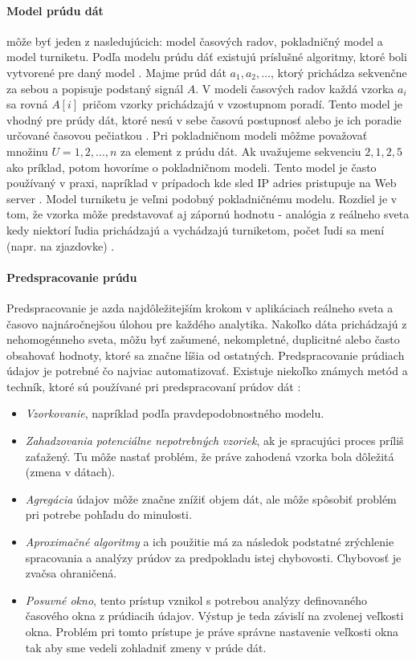 \paragraph{Model prúdu dát} môže byť jeden z nasledujúcich: model časových radov, pokladničný model a model turniketu. Podľa modelu prúdu dáť existujú príslušné algoritmy, ktoré boli vytvorené pre daný model \citep{tran2014change}. Majme prúd dát $a_1, a_2, ...$, ktorý prichádza sekvenčne za sebou a popisuje podstaný signál $A$. 
V modeli časových radov každá vzorka $a_i$ sa rovná $A[i]$ pričom vzorky prichádzajú v vzostupnom poradí. Tento model je vhodný pre prúdy dát, ktoré nesú v sebe časovú postupnosť alebo je ich poradie určované časovou pečiatkou \citep{muthukrishnan2005data}.
Pri pokladničnom modeli môžme považovať množinu $U = {1, 2, ..., n}$ za element z prúdu dát. Ak uvažujeme sekvenciu $2, 1, 2, 5$ ako príklad, potom hovoríme o pokladničnom modeli. Tento model je často používaný v praxi, napríklad v prípadoch kde sled IP adries pristupuje na Web server \citep{ikonomovska2013algorithmic, muthukrishnan2005data}.
Model turniketu je veľmi podobný pokladničnému modelu. Rozdiel je v tom, že vzorka môže predstavovať aj zápornú hodnotu - analógia z reálneho sveta kedy niektorí ľudia prichádzajú a vychádzajú turniketom, počet ľudi sa mení (napr. na zjazdovke) \citep{ikonomovska2013algorithmic, muthukrishnan2005data}.

\paragraph{Predspracovanie prúdu}
Predspracovanie je azda najdôležitejším krokom v aplikáciach reálneho sveta a časovo najnáročnejšou úlohou pre každého analytika. Nakoľko dáta prichádzajú z nehomogénneho sveta, môžu byť zašumené, nekompletné, duplicitné alebo často obsahovať hodnoty, ktoré sa značne líšia od ostatných. Predspracovanie prúdiach údajov je potrebné čo najviac automatizovať. Existuje niekoľko známych metód a techník, ktoré sú používané pri predspracovaní prúdov dát \citep{krempl2014open, nguyen2015survey}:
\begin{itemize}
	\item \textit{Vzorkovanie}, napríklad podľa pravdepodobnostného modelu.
	\item \textit{Zahadzovania potenciálne nepotrebných vzoriek}, ak je spracujúci proces príliš zaťažený. Tu môže nastať problém, že práve zahodená vzorka bola dôležitá (zmena v dátach).
	\item \textit{Agregácia} údajov môže značne znížiť objem dát, ale môže spôsobiť problém pri potrebe pohľadu do minulosti.
	\item \textit{Aproximačné algoritmy} a ich použitie má za následok podstatné zrýchlenie spracovania a analýzy prúdov za predpokladu istej chybovosti. Chybovosť je zvačsa ohraničená.
	\item \textit{Posuvné okno}, tento prístup vznikol s potrebou analýzy definovaného časového okna z prúdiacih údajov. Výstup je teda závislí na zvolenej veľkosti okna. Problém pri tomto prístupe je práve správne nastavenie veľkosti okna tak aby sme vedeli zohladniť zmeny v prúde dát.
\end{itemize}

